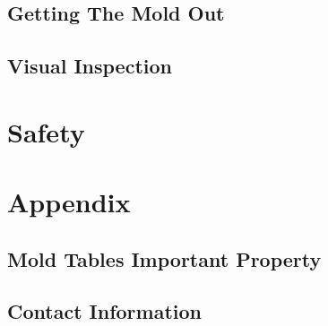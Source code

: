 \documentclass{article}
\begin{document}
\subsection{Getting The Mold Out}
\subsection{Visual Inspection}

\section{Safety}
\section{Appendix}
\subsection{Mold Tables Important Property}\label{Mold_Tables}
\subsection{Contact Information}
\end{document}
